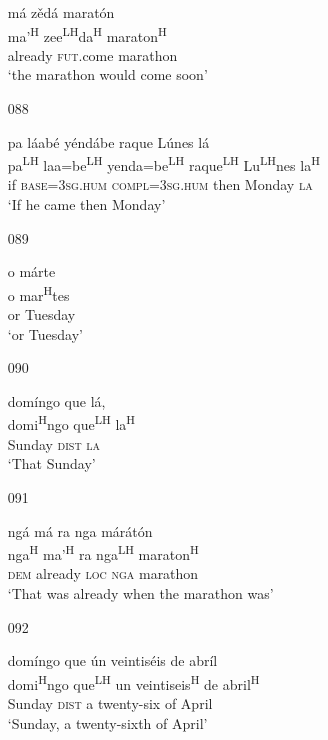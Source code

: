 \begin{itemize}
\glll   m\'{a} z\v{e}d\'{a} marat\'{o}n \\
ma'\textsuperscript{H} zee\textsuperscript{LH}da\textsuperscript{H} maraton\textsuperscript{H} \\
already \textsc{fut}.come marathon\\
\glt `the marathon would come soon'
 


\item[088]
 
\glll   pa l\'{a}ab\'{e} y\'{e}nd\'{a}be raque L\'{u}nes l\'{a} \\
pa\textsuperscript{LH} laa=be\textsuperscript{LH} yenda=be\textsuperscript{LH} raque\textsuperscript{LH} Lu\textsuperscript{LH}nes la\textsuperscript{H} \\
if \textsc{base}=\textsc{3sg.hum} \textsc{compl}=\textsc{3sg.hum} then Monday \textsc{la} \\
\glt `If he came then Monday'
 


\item[089]
 
\glll   o m\'{a}rte \\
o mar\textsuperscript{H}tes \\
or Tuesday \\
\glt `or Tuesday'
 


\item[090]
 
\glll   dom\'{i}ngo que l\'{a}, \\
domi\textsuperscript{H}ngo que\textsuperscript{LH} la\textsuperscript{H} \\
Sunday \textsc{dist} \textsc{la} \\
\glt `That Sunday'
 

\item[091]
 
\glll   ng\'{a} m\'{a} ra nga m\'{a}r\'{a}t\'{o}n \\
 nga\textsuperscript{H} ma'\textsuperscript{H} ra nga\textsuperscript{LH} maraton\textsuperscript{H} \\
\textsc{dem} already \textsc{loc} \textsc{nga} marathon \\
\glt `That was already when the marathon was'
 


\item[092]
 
\glll   dom\'{i}ngo que \'{u}n veintis\'{e}is de abr\'{i}l \\
domi\textsuperscript{H}ngo que\textsuperscript{LH} un veintiseis\textsuperscript{H} de abril\textsuperscript{H} \\
Sunday \textsc{dist} a twenty-six of April \\
\glt `Sunday, a twenty-sixth of April'
 


\end{itemize}
